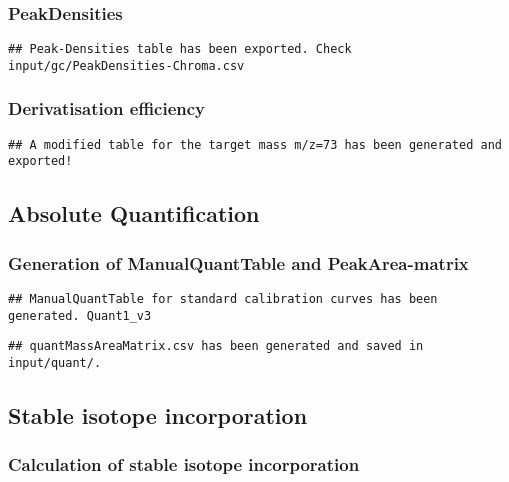 \documentclass[9pt,]{article}
\begin{document}
\subsubsection{PeakDensities}\label{peakdensities}

\begin{verbatim}
## Peak-Densities table has been exported. Check input/gc/PeakDensities-Chroma.csv
\end{verbatim}

\subsubsection{Derivatisation
efficiency}\label{derivatisation-efficiency}

\begin{verbatim}
## A modified table for the target mass m/z=73 has been generated and exported!
\end{verbatim}

\subsection{Absolute Quantification}\label{absolute-quantification}

\subsubsection{Generation of ManualQuantTable and
PeakArea-matrix}\label{generation-of-manualquanttable-and-peakarea-matrix}

\begin{verbatim}
## ManualQuantTable for standard calibration curves has been generated. Quant1_v3
\end{verbatim}

\begin{verbatim}
## quantMassAreaMatrix.csv has been generated and saved in input/quant/.
\end{verbatim}

\subsection{Stable isotope
incorporation}\label{stable-isotope-incorporation}

\subsubsection{Calculation of stable isotope
incorporation}\label{calculation-of-stable-isotope-incorporation}
\end{document}
